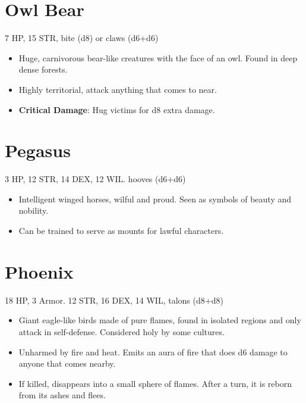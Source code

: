 \documentclass[
  10pt,
  american,
]{article}
\begin{document}
\hypertarget{owl-bear}{%
\section{Owl Bear}\label{owl-bear}}

7 HP, 15 STR, bite (d8) or claws (d6+d6)

\begin{samepage}
\begin{itemize}
\setlength\itemsep{-.5em}
\item Huge, carnivorous bear-like creatures with the face of an owl. Found in deep dense forests.
\item Highly territorial, attack anything that comes to near.
\item \textbf{Critical Damage}: Hug victims for d8 extra damage.
\end{itemize}
\end{samepage}

\hypertarget{pegasus}{%
\section{Pegasus}\label{pegasus}}

3 HP, 12 STR, 14 DEX, 12 WIL. hooves (d6+d6)

\begin{samepage}
\begin{itemize}
\setlength\itemsep{-.5em}
\item Intelligent winged horses, wilful and proud. Seen as symbols of beauty and nobility.
\item Can be trained to serve as mounts for lawful characters.
\end{itemize}
\end{samepage}

\hypertarget{phoenix}{%
\section{Phoenix}\label{phoenix}}

18 HP, 3 Armor. 12 STR, 16 DEX, 14 WIL, talons (d8+d8)

\begin{samepage}
\begin{itemize}
\setlength\itemsep{-.5em}
\item Giant eagle-like birds made of pure flames, found in isolated regions and only attack in self-defense. Considered holy by some cultures.
\item Unharmed by fire and heat. Emits an aura of fire that does d6 damage to anyone that comes nearby.
\item If killed, disappears into a small sphere of flames. After a turn, it is reborn from its ashes and flees.
\end{itemize}
\end{samepage}
\end{document}

